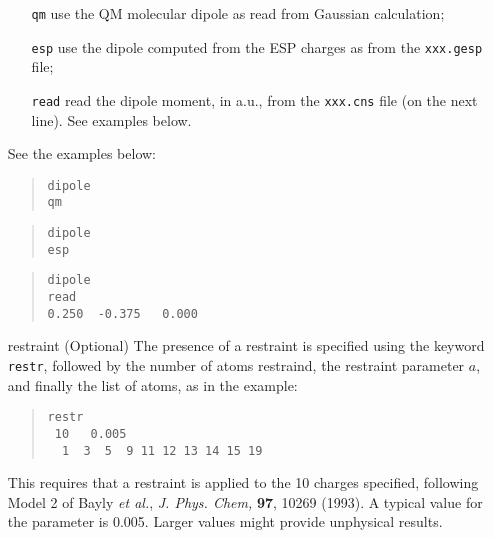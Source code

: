 \documentclass[a4paper]{report}
\begin{document}
\begin{itemize}
\begin{itemize}
\item[\texttt{qm}] use the QM molecular dipole as read from Gaussian calculation;
\item[\texttt{esp}] use the dipole computed from the ESP charges as from the \texttt{xxx.gesp} file; 
\item[\texttt{read}] read the dipole moment, in a.u., from the \texttt{xxx.cns} file (on the next line). See examples below.
\end{itemize}
See the examples below:
\begin{framed}
\begin{quote}
\begin{verbatim}
dipole 
qm
\end{verbatim}
\end{quote}
\end{framed}
\begin{framed}
\begin{quote}
\begin{verbatim}
dipole 
esp
\end{verbatim}
\end{quote}
\end{framed}
\begin{framed}
\begin{quote}
\begin{verbatim}
dipole 
read
0.250  -0.375   0.000
\end{verbatim}
\end{quote}
\end{framed}

\item[restraint] (Optional) The presence of a restraint is specified using the
keyword \texttt{restr}, followed by the number of atoms restraind, the restraint 
parameter $a$, and finally the list of atoms, as in the example:
\begin{framed}
\begin{quote}
\begin{verbatim}
restr
 10   0.005
  1  3  5  9 11 12 13 14 15 19
\end{verbatim}
\end{quote}
\end{framed}
This requires that a restraint is applied to the 10 charges specified, following Model 2 of Bayly \emph{et al.}, \emph{J. Phys. Chem,} \textbf{97}, 10269 (1993). A typical value for the parameter is 0.005. Larger values might provide unphysical results.

\end{itemize}
\end{document}
